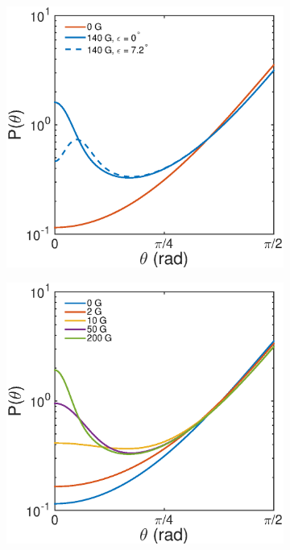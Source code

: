 \documentclass[aps,prl,superscriptaddress]{revtex4-1}
\begin{document}
\begin{figure}
\begin{subfigure}[t]{0.45\columnwidth}
    	\includegraphics[width=\textwidth]{figs/Figure4.eps}
    	\caption{\label{theorya}}
    \end{subfigure}
	\begin{subfigure}[t]{0.45\columnwidth}
    	\includegraphics[width=\textwidth]{figs/Figure4b.eps}

\end{subfigure}
\end{figure}
\end{document}
